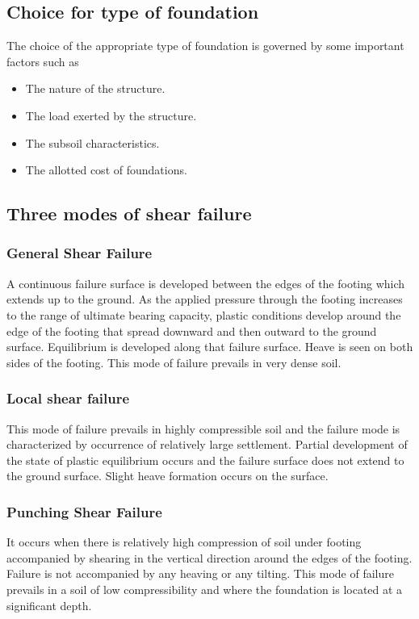 \subsection{Choice for type of foundation}
The choice of the appropriate type of foundation is governed by some important factors such as
\begin{itemize}
	\item The nature of the structure.
	\item The load exerted by the structure.
	\item The subsoil characteristics.
	\item The allotted cost of foundations.
\end{itemize}

\subsection{Three modes of shear failure}
\subsubsection{General Shear Failure}
A continuous failure surface is developed between the edges of the footing which extends up to the ground. As the applied pressure through the footing increases to the range of ultimate bearing capacity, plastic conditions develop around the edge of the footing that spread downward and then outward to the ground surface. Equilibrium is developed along that failure surface. Heave is seen on both sides of the footing. This mode of failure prevails in very dense soil.
\subsubsection{Local shear failure}
This mode of failure prevails in highly compressible soil and the failure mode is characterized by occurrence of relatively large settlement. Partial development of the state of plastic equilibrium occurs and the failure surface does not extend to the ground surface. Slight heave formation occurs on the surface.
\subsubsection{Punching Shear Failure}
It occurs when there is relatively high compression of soil under footing accompanied by shearing in the vertical direction around the edges of the footing. Failure is not accompanied by any heaving or any tilting. This mode of failure prevails in a soil of low compressibility and where the foundation is located at a significant depth.


